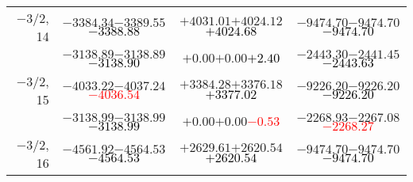 \documentclass[compress]{beamer}
\begin{document}
\begin{frame}
{\begin{tabular}{r | c | c | c}
$-$3/2, 14 & $-3384.34$\hspace{0.1 cm}$-3389.55$\hspace{0.1 cm}\textcolor{black}{$-3388.88$} & $+4031.01$\hspace{0.1 cm}$+4024.12$\hspace{0.1 cm}\textcolor{black}{$+4024.68$} & $-9474.70$\hspace{0.1 cm}$-9474.70$\hspace{0.1 cm}\textcolor{black}{$-9474.70$} \\
           & $-3138.89$\hspace{0.1 cm}$-3138.89$\hspace{0.1 cm}\textcolor{black}{$-3138.90$} & $+0.00$\hspace{0.1 cm}$+0.00$\hspace{0.1 cm}\textcolor{black}{$+2.40$} & $-2443.30$\hspace{0.1 cm}$-2441.45$\hspace{0.1 cm}\textcolor{black}{$-2443.63$} \\
$-$3/2, 15 & $-4033.22$\hspace{0.1 cm}$-4037.24$\hspace{0.1 cm}\textcolor{red}{$-4036.54$} & $+3384.28$\hspace{0.1 cm}$+3376.18$\hspace{0.1 cm}\textcolor{black}{$+3377.02$} & $-9226.20$\hspace{0.1 cm}$-9226.20$\hspace{0.1 cm}\textcolor{black}{$-9226.20$} \\
           & $-3138.99$\hspace{0.1 cm}$-3138.99$\hspace{0.1 cm}\textcolor{black}{$-3138.99$} & $+0.00$\hspace{0.1 cm}$+0.00$\hspace{0.1 cm}\textcolor{red}{$-0.53$} & $-2268.93$\hspace{0.1 cm}$-2267.08$\hspace{0.1 cm}\textcolor{red}{$-2268.27$} \\
$-$3/2, 16 & $-4561.92$\hspace{0.1 cm}$-4564.53$\hspace{0.1 cm}\textcolor{black}{$-4564.53$} & $+2629.61$\hspace{0.1 cm}$+2620.54$\hspace{0.1 cm}\textcolor{black}{$+2620.54$} & $-9474.70$\hspace{0.1 cm}$-9474.70$\hspace{0.1 cm}\textcolor{black}{$-9474.70$} \\

\end{tabular}}
\end{frame}
\end{document}
